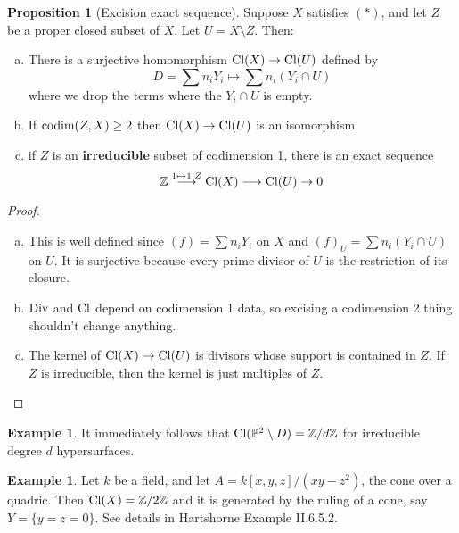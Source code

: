 \documentclass[10pt,reqno]{amsart}
\theoremstyle{definition}
\newtheorem{example}[theorem]{Example}
\newtheorem{proposition}[theorem]{Proposition}
\theoremstyle{remark}
\numberwithin{equation}{section}
\numberwithin{theorem}{section}
\newcommand{\Z}{{\mathbb Z}}
\newcommand{\cl}{\textup{Cl}}
\newcommand{\codim}{\textup{codim}}
\newcommand{\PP}{{\mathbb P}}
\begin{document}
\begin{proposition}[Excision exact sequence]
Suppose $X$ satisfies $(\ast)$, and let $Z$ be a proper closed subset of $X$. Let $U = X \setminus Z$. Then:
\begin{enumerate}[(a)]
\item There is a surjective homomorphism $\cl(X) \to \cl(U)$ defined by 
\[D = \sum n_i Y_i \mapsto \sum n_i(Y_i \cap U)\]
where we drop the terms where the $Y_i \cap U$ is empty.
\item If $\codim(Z,X) \ge 2$ then $\cl(X) \to \cl(U)$ is an isomorphism
\item if $Z$ is an \textbf{irreducible} subset of codimension 1, there is an exact sequence
\[\Z \stackrel{1 \mapsto 1 \cdot Z}{\longrightarrow} \cl(X) \longrightarrow \cl(U) \to 0\]
\end{enumerate}
\end{proposition}
\begin{proof}\text{ }
\begin{enumerate}[(a)] 
\item This is well defined since $(f) = \sum n_i Y_i$ on $X$ and $(f)_U = \sum n_i (Y_i \cap U)$ on $U$. It is surjective because every prime divisor of $U$ is the restriction of its closure.
\item $\textup{Div}$ and $\cl$ depend on codimension 1 data, so excising a codimension 2 thing shouldn't change anything.
\item The kernel of $\cl(X) \to \cl(U)$ is divisors whose support is contained in $Z$. If $Z$ is irreducible, then the kernel is just multiples of $Z$.
\end{enumerate}
\end{proof}

\begin{example} It immediately follows that $\cl(\PP^2 \setminus D) = \Z/d\Z$ for irreducible degree $d$ hypersurfaces.
\end{example}

\begin{example} Let $k$ be a field, and let $A = k[x,y,z]/(xy-z^2)$, the cone over a quadric. Then $\cl(X) = \Z/2\Z$ and it is generated by the ruling of a cone, say $Y = \{y = z = 0\}$. See details in Hartshorne Example II.6.5.2.
\end{example}
\vspace{1em}
\end{document}
